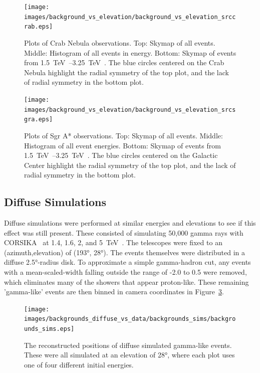   \begin{figure}[!p]
    \centering
    \texttt{[image: images/background\_vs\_elevation/background\_vs\_elevation\_srccrab.eps]}
    \caption[Background Vs Elevation Crab Nebula]
    {\small 
      Plots of Crab Nebula observations.
      Top: Skymap of all events.
      Middle: Histogram of all events in energy.
      Bottom: Skymap of events from \SIrange{1.5}{3.25}{\TeV{}}.  
      The blue circles centered on the Crab Nebula highlight the radial symmetry of the top plot, and the lack of radial symmetry in the bottom plot.
    }
    \label{fig:bkgvsel_crab}
  \end{figure}

  \begin{figure}[!p]
    \centering
    \texttt{[image: images/background\_vs\_elevation/background\_vs\_elevation\_srcsgra.eps]}
    \caption[Background Vs Elevation Sgr A*]
    {\small 
      Plots of Sgr A* observations.
      Top: Skymap of all events.
      Middle: Histogram of all event energies.
      Bottom: Skymap of events from \SIrange{1.5}{3.25}{\TeV{}}.  
      The blue circles centered on the Galactic Center highlight the radial symmetry of the top plot, and the lack of radial symmetry in the bottom plot.
    }
    \label{fig:bkgvsel_sgra}
  \end{figure}
  
  \FloatBarrier

  \subsection{Diffuse Simulations}\label{subsubsec:diffusesims}
    Diffuse simulations were performed at similar energies and elevations to see if this effect was still present.
    These consisted of simulating 50,000 gamma rays with CORSIKA~\cite{corsika1998} at 1.4, 1.6, 2, and \SI{5}{\TeV{}}.
    The telescopes were fixed to an (azimuth,elevation) of (\ang{193}, \ang{28}).
    The events themselves were distributed in a diffuse \ang{2.5}-radius disk.
    To approximate a simple gamma-hadron cut, any events with a mean-scaled-width falling outside the range of -2.0 to 0.5 were removed, which eliminates many of the showers that appear proton-like.
    These remaining 'gamma-like' events are then binned in camera coordinates in Figure~\ref{fig:back_simdiffuse}.

    \begin{figure}[!ht]
      \centering
      \texttt{[image: images/backgrounds\_diffuse\_vs\_data/backgrounds\_sims/backgrounds\_sims.eps]}
      \caption[Diffuse Simulated Backgrounds]{
        The reconstructed positions of diffuse simulated gamma-like events.
        These were all simulated at an elevation of \ang{28}, where each plot uses one of four different initial energies.
      }
      \label{fig:back_simdiffuse}
    \end{figure}

